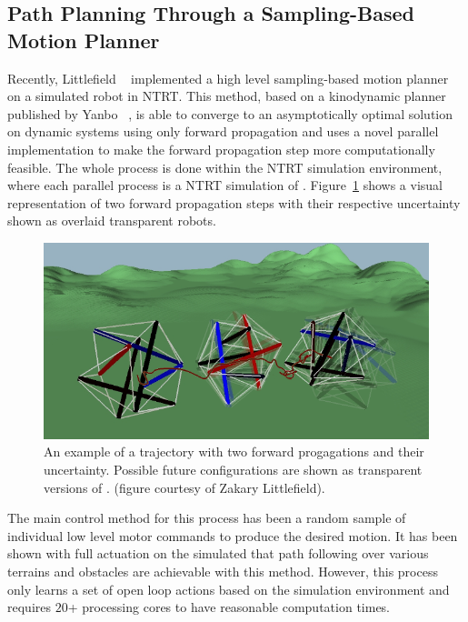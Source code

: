 \subsection{Path Planning Through a Sampling-Based Motion Planner}
\label{sec:belief}

Recently, Littlefield \etal~\cite{littlefieldintegrating} implemented a high level sampling-based motion planner on a simulated \SB{} robot in NTRT.
This method, based on a kinodynamic planner published by Yanbo \etal~\cite{li2016asymptotically}, is able to converge to an asymptotically optimal solution on dynamic systems using only forward propagation and uses a novel parallel implementation to make the forward propagation step more computationally feasible.
The whole process is done within the NTRT simulation environment, where each parallel process is a NTRT simulation of \SB{}.
Figure~\ref{fig:particles} shows a visual representation of two forward propagation steps with their respective uncertainty shown as overlaid transparent robots.

\begin{figure}[thpb]
    \centering
    \includegraphics[width=\linewidth]{tex/img/particles}
    \caption{
        \label{fig:particles}
        An  example of a trajectory with two forward progagations and their uncertainty. 
        Possible future configurations are shown as transparent versions of \SB{}.
        (figure courtesy of Zakary Littlefield).
            }
\end{figure}

The main control method for this process has been a random sample of individual low level motor commands to produce the desired motion.
It has been shown with full actuation on the simulated \SB{} that path following over various terrains and obstacles are achievable with this method.
However, this process only learns a set of open loop actions based on the simulation environment and requires \(20\)+ processing cores to have reasonable computation times.

